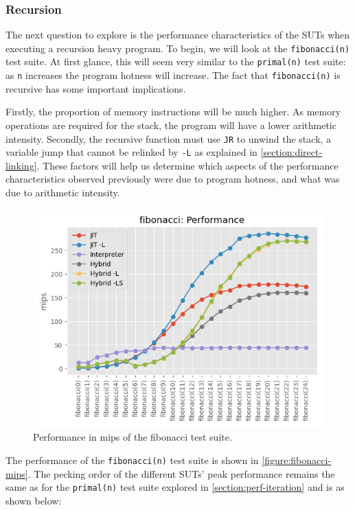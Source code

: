 \subsubsection{Recursion}
\label{section:perf-recursion}

The next question to explore is the performance characteristics of the SUTs when executing a recursion heavy program. To begin, we will look at the \texttt{fibonacci(n)} test suite. At first glance, this will seem very similar to the \texttt{primal(n)} test suite: as \texttt{n} increases the program hotness will increase. The fact that \texttt{fibonacci(n)} is recursive has some important implications.

Firstly, the proportion of memory instructions will be much higher. As memory operations are required for the stack, the program will have a lower arithmetic intensity. Secondly, the recursive function must use \texttt{JR} to unwind the stack, a variable jump that cannot be relinked by \texttt{-L} as explained in \autoref{section:direct-linking}. These factors will help us determine which aspects of the performance characteristics observed previously were due to program hotness, and what was due to arithmetic intensity.

\begin{figure}[H]
    \centering
    \includegraphics[scale=0.75]{output/graphs/tests/all/fibonacci/mips.png}
    \caption{Performance in mips of the fibonacci test suite.}
    \label{figure:fibonacci-mips}
\end{figure}

The performance of the \texttt{fibonacci(n)} test suite is shown in \autoref{figure:fibonacci-mips}. The pecking order of the different SUTs' peak performance remains the same as for the \texttt{primal(n)} test suite explored in \autoref{section:perf-iteration} and is as shown below:

